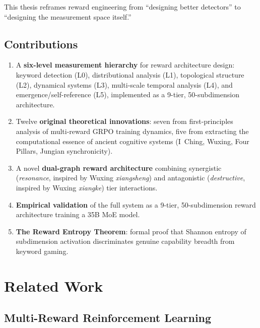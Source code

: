 \documentclass{article}
\begin{document}
This thesis reframes reward engineering from ``designing better detectors'' to ``designing the measurement space itself.''

\subsection{Contributions}

\begin{enumerate}
    \item A \textbf{six-level measurement hierarchy} for reward architecture design: keyword detection (L0), distributional analysis (L1), topological structure (L2), dynamical systems (L3), multi-scale temporal analysis (L4), and emergence/self-reference (L5), implemented as a 9-tier, 50-subdimension architecture.
    
    \item Twelve \textbf{original theoretical innovations}: seven from first-principles analysis of multi-reward GRPO training dynamics, five from extracting the computational essence of ancient cognitive systems (I~Ching, Wuxing, Four Pillars, Jungian synchronicity).
    
    \item A novel \textbf{dual-graph reward architecture} combining synergistic (\emph{resonance}, inspired by Wuxing \emph{xiangsheng}) and antagonistic (\emph{destructive}, inspired by Wuxing \emph{xiangke}) tier interactions.
    
    \item \textbf{Empirical validation} of the full system as a 9-tier, 50-subdimension reward architecture training a 35B MoE model.
    
    \item \textbf{The Reward Entropy Theorem}: formal proof that Shannon entropy of subdimension activation discriminates genuine capability breadth from keyword gaming.
\end{enumerate}

\section{Related Work}

\subsection{Multi-Reward Reinforcement Learning}
\end{document}
